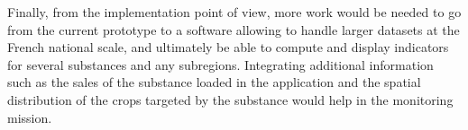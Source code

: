Finally, from the implementation point of view, more work would be needed to go from the current prototype to a software allowing to handle larger datasets at the French national scale, and ultimately be able to compute and display indicators for several substances and any subregions. Integrating additional information such as the sales of the substance loaded in the application and the spatial distribution of the crops targeted by the substance would help in the monitoring mission.   




